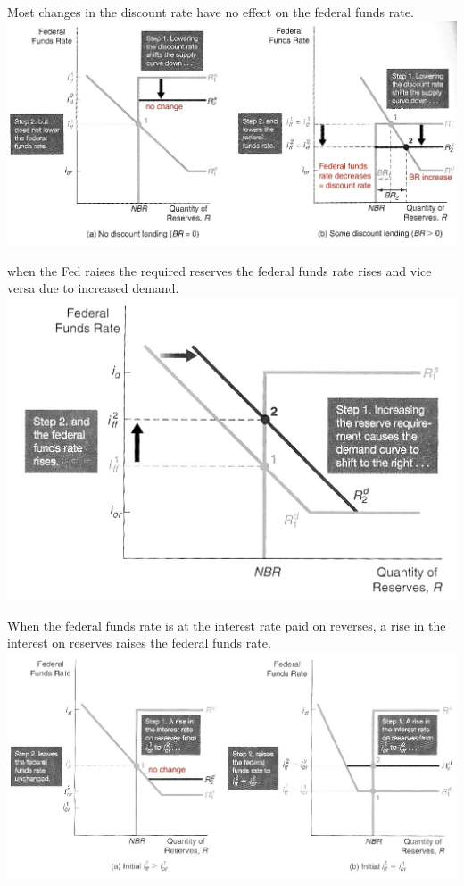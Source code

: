 \documentclass[12pt]{examnotes}
\begin{document}
\ra Most changes in the discount rate have no effect on the federal funds rate.
\includegraphics[scale=0.5]{./imgs/163.jpg}

\ra when the Fed raises the required reserves the federal funds rate rises and vice versa due to increased demand.
\includegraphics[scale=0.32]{./imgs/164.jpg}

\ra When the federal funds rate is at the interest rate paid on reverses, a rise in the interest on reserves raises the federal funds rate.
\includegraphics[scale=0.5]{./imgs/165.jpg}
\end{document}
